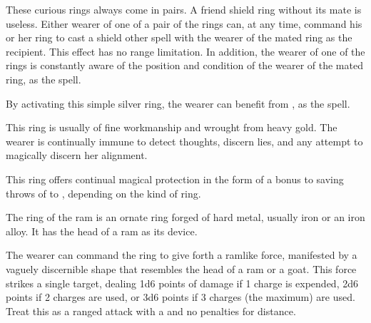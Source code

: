 
 These curious rings always come in pairs. A friend shield ring without its mate is useless. Either wearer of one of a pair of the rings can, at any time, command his or her ring to cast a shield other spell with the wearer of the mated ring as the recipient. This effect has no range limitation. In addition, the wearer of one of the rings is constantly aware of the position and condition of the wearer of the mated ring, as the  spell.


 By activating this simple silver ring, the wearer can benefit from , as the spell. 


 This ring is usually of fine workmanship and wrought from heavy gold. The wearer is continually immune to detect thoughts, discern lies, and any attempt to magically discern her alignment.


 This ring offers continual magical protection in the form of a bonus to saving throws of  to , depending on the kind of ring.


 The ring of the ram is an ornate ring forged of hard metal, usually iron or an iron alloy. It has the head of a ram as its device.

The wearer can command the ring to give forth a ramlike force, manifested by a vaguely discernible shape that resembles the head of a ram or a goat. This force strikes a single target, dealing 1d6 points of  damage if 1 charge is expended, 2d6 points if 2 charges are used, or 3d6 points if 3 charges (the maximum) are used. Treat this as a ranged attack with a  and no penalties for distance.

